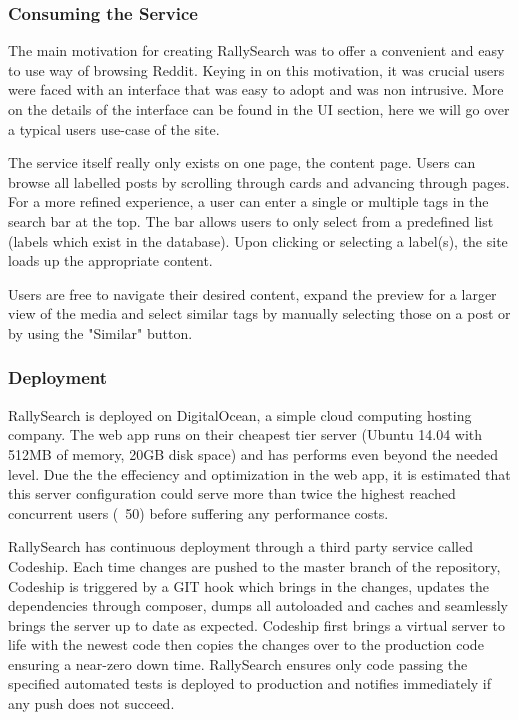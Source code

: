 \documentclass[msc,oneside]{ubcthesis}%
\begin{document}
\subsubsection{Consuming the Service}
The main motivation for creating RallySearch was to offer a convenient and easy to use way of browsing Reddit. Keying in on this motivation, it was crucial users were faced with an interface that was easy to adopt and was non intrusive. More on the details of the interface can be found in the UI section, here we will go over a typical users use-case of the site.
\par
The service itself really only exists on one page, the content page. Users can browse all labelled posts by scrolling through cards and advancing through pages. For a more refined experience, a user can enter a single or multiple tags in the search bar at the top. The bar allows users to only select from a predefined list (labels which exist in the database). Upon clicking or selecting a label(s), the site loads up the appropriate content.
\par
Users are free to navigate their desired content, expand the preview for a larger view of the media and select similar tags by manually selecting those on a post or by using the "Similar" button.

\subsubsection{Deployment}
RallySearch is deployed on DigitalOcean, a simple cloud computing hosting company. The web app runs on their cheapest tier server (Ubuntu 14.04 with 512MB of memory, 20GB disk space) and has performs even beyond the needed level. Due the the effeciency and optimization in the web app, it is estimated that this server configuration could serve more than twice the highest reached concurrent users (~50) before suffering any performance costs. 
\par
RallySearch has continuous deployment through a third party service called Codeship. Each time changes are pushed to the master branch of the repository, Codeship is triggered by a GIT hook which brings in the changes, updates the dependencies through composer, dumps all autoloaded and caches and seamlessly brings the server up to date as expected. Codeship first brings a virtual server to life with the newest code then copies the changes over to the production code ensuring a near-zero down time. RallySearch ensures only code passing the specified automated tests is deployed to production and notifies immediately if any push does not succeed.
\end{document}
